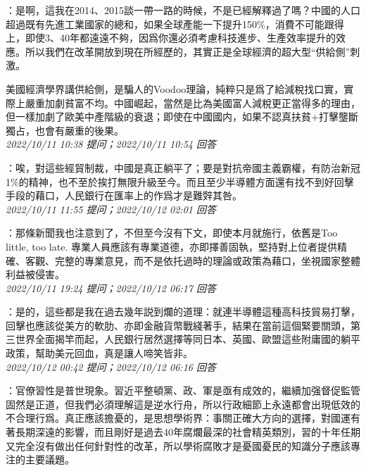 \documentclass[twocolumn]{ctexart}
\begin{document}
：是啊，這我在2014、2015談一帶一路的時候，不是已經解釋過了嗎？中國的人口超過既有先進工業國家的總和，如果全球產能一下提升150\%，消費不可能跟得上，即使3、40年都遠遠不夠，因爲你還必須考慮科技進步、生產效率提升的效應。所以我們在改革開放到現在所經歷的，其實正是全球經濟的超大型“供給側”刺激。

美國經濟學界講供給側，是騙人的Voodoo理論，純粹只是爲了給減稅找口實，實際上嚴重加劇貧富不均。中國崛起，當然是比為美國富人減稅更正當得多的理由，但一樣加劇了歐美中產階級的衰退；即使在中國國内，如果不認真扶貧+打擊壟斷獨占，也會有嚴重的後果。
\\

\textit{\hfill\noindent\small 2022/10/11 10:38 提问；2022/10/11 10:54 回答}

：唉，對這些經貿制裁，中國是真正躺平了；要是對抗帝國主義霸權，有防治新冠1\%的精神，也不至於挨打無限升級至今。而且至少半導體方面還有找不到好回擊手段的藉口，人民銀行在匯率上的作爲才是難辤其咎。
\\

\textit{\hfill\noindent\small 2022/10/11 11:55 提问；2022/10/12 02:01 回答}

：那條新聞我也注意到了，不但至今沒有下文，即使本月就施行，依舊是Too little, too late. 專業人員應該有專業道德，亦即擇善固執，堅持對上位者提供精確、客觀、完整的專業意見，而不是依托過時的理論或政策為藉口，坐視國家整體利益被侵害。
\\

\textit{\hfill\noindent\small 2022/10/11 19:24 提问；2022/10/12 06:17 回答}

：是的，這些都是我在過去幾年説到爛的道理：就連半導體這種高科技貿易打擊，回擊也應該從美方的軟肋、亦即金融貨幣戰綫著手，結果在當前這個緊要關頭，第三世界全面揭竿而起，人民銀行居然選擇等同日本、英國、歐盟這些附庸國的躺平政策，幫助美元回血，真是讓人啼笑皆非。
\\

\textit{\hfill\noindent\small 2022/10/12 00:42 提问；2022/10/12 06:16 回答}

：官僚習性是普世現象。習近平整頓黨、政、軍是亟有成效的，繼續加强督促監管固然是正道，但我們必須理解這是逆水行舟，所以行政細節上永遠都會出現低效的不合理行爲。真正應該擔憂的，是思想學術界：事關正確大方向的選擇，對國運有著長期深遠的影響，而且剛好是過去40年腐爛最深的社會精英類別，習的十年任期又完全沒有做出任何針對性的改革，所以學術腐敗才是憂國憂民的知識分子應該專注的主要議題。
\\
\end{document}
